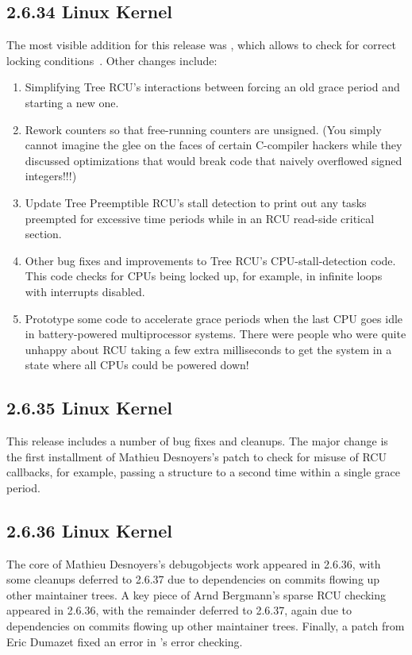 \subsection{2.6.34 Linux Kernel}

The most visible addition for this release was ,
which allows  to check for correct locking
conditions~\cite{PaulEMcKenney2010LockdepRCU}.
Other changes include:

\begin{enumerate}
\item	Simplifying Tree RCU's interactions between
	forcing an old grace period and starting a new one.
\item	Rework counters so that free-running counters are unsigned.
	(You simply cannot imagine the glee on the faces of certain
	C-compiler hackers while they discussed optimizations that would
	break code that naively overflowed signed integers!!!)
\item	Update Tree Preemptible RCU's stall detection to print out
	any tasks preempted for excessive time periods while in
	an RCU read-side critical section.
\item	Other bug fixes and improvements to Tree RCU's CPU-stall-detection
	code.
	This code checks for CPUs being locked up, for example,
	in infinite loops with interrupts disabled.
\item	Prototype some code to accelerate grace periods when the
	last CPU goes idle in battery-powered multiprocessor
	systems.
	There were people who were quite unhappy about RCU taking
	a few extra milliseconds to get the system in a state
	where all CPUs could be powered down!
\end{enumerate}

\subsection{2.6.35 Linux Kernel}

This release includes a number of bug fixes and cleanups.
The major change is the first installment of Mathieu Desnoyers's
patch to check for misuse of RCU callbacks, for example, passing
a  structure to  a second time within
a single grace period.

\subsection{2.6.36 Linux Kernel}

The core of Mathieu Desnoyers's debugobjects work appeared in 2.6.36,
with some cleanups deferred to 2.6.37 due to dependencies on commits
flowing up other maintainer trees.
A key piece of Arnd Bergmann's sparse RCU checking appeared in 2.6.36,
with the remainder deferred to 2.6.37, again due to dependencies on
commits flowing up other maintainer trees.
Finally, a patch from Eric Dumazet fixed an error in
's error checking.

